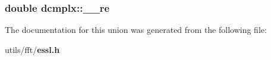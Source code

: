 \subsubsection{\setlength{\rightskip}{0pt plus 5cm}double {\bf dcmplx::\_\-\_\-re}}\label{uniondcmplx_742296acc890f55db1aa1500b883d03c}




The documentation for this union was generated from the following file:\begin{CompactItemize}
\item 
utils/fft/{\bf essl.h}\end{CompactItemize}
